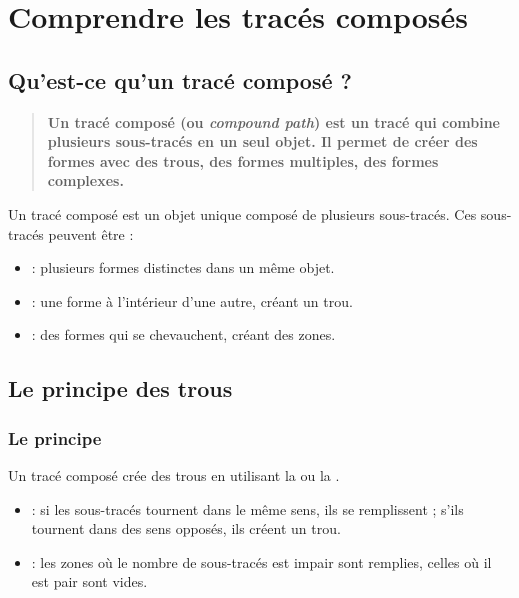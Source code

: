 \section{Comprendre les tracés composés}

\subsection{Qu'est-ce qu'un tracé composé ?}

\begin{quote}
\textbf{Un tracé composé (ou \emph{compound path}) est un tracé qui combine plusieurs sous-tracés en un seul objet. Il permet de créer des formes avec des trous, des formes multiples, des formes complexes.}
\end{quote}

Un tracé composé est un objet unique composé de plusieurs sous-tracés. Ces sous-tracés peuvent être :

\begin{itemize}
    \item {} : plusieurs formes distinctes dans un même objet.
    \item {} : une forme à l'intérieur d'une autre, créant un trou.
    \item {} : des formes qui se chevauchent, créant des zones.
\end{itemize}

\subsection{Le principe des trous}

\subsubsection{Le principe}

Un tracé composé crée des trous en utilisant la  ou la .

\begin{itemize}
    \item {} : si les sous-tracés tournent dans le même sens, ils se remplissent ; s'ils tournent dans des sens opposés, ils créent un trou.
    \item {} : les zones où le nombre de sous-tracés est impair sont remplies, celles où il est pair sont vides.
\end{itemize}

